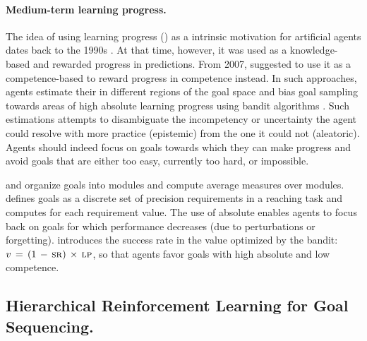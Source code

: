 \paragraph{Medium-term learning progress.} 
The idea of using learning progress (\lp) as a intrinsic motivation for artificial agents dates back to the 1990s \cite{schmidhuber1991curious,schmidhuber1991learning,kaplan_maximizing_2004,oudeyer_intrinsic_2007}. At that time, however, it was used as a knowledge-based \im and rewarded progress in predictions. From 2007, \cite{oudeyer2007intrinsic} suggested to use it as a competence-based \im to reward progress in competence instead. In such approaches, agents estimate their \lp in different regions of the goal space and bias goal sampling towards areas of high absolute learning progress using bandit algorithms \cite{baranes2013active,moulinfriergmm,forestier2016modular,fournier2018accuracy,fournier2019clic,curious,blaes2019control,portelas_teacher_2020,akakzia2020decstr}. Such estimations attempts to disambiguate the incompetency or uncertainty the agent could resolve with more practice (epistemic) from the one it could not (aleatoric). Agents should indeed focus on goals towards which they can make progress and avoid goals that are either too easy, currently too hard, or impossible. 

\cite{forestier2016modular,curious,blaes2019control} and \cite{akakzia2020decstr} organize goals into modules and compute average \lp measures over modules. \cite{fournier2018accuracy} defines goals as a discrete set of precision requirements in a reaching task and computes \lp for each requirement value. The use of absolute \lp enables agents to focus back on goals for which performance decreases (due to perturbations or forgetting). \cite{akakzia2020decstr} introduces the success rate in the value optimized by the bandit: $v\,=\,(1\,-\,\text{\textsc{sr}})\,\times\,\text{\textsc{lp}}$, so that agents favor goals with high absolute \lp and low competence.

\subsection{Hierarchical Reinforcement Learning for Goal Sequencing.}

